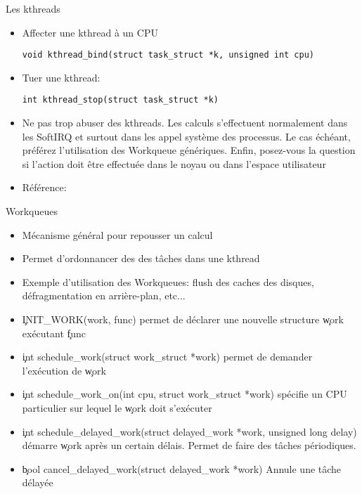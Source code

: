 \begin{frame}[fragile=singleslide]{Les kthreads}
  \begin{itemize}
  \item Affecter une kthread à un CPU
    \begin{lstlisting}
void kthread_bind(struct task_struct *k, unsigned int cpu)
    \end{lstlisting} 
  \item Tuer une kthread:
    \begin{lstlisting} 
int kthread_stop(struct task_struct *k)
    \end{lstlisting} 
  \item  Ne pas  trop abuser  des kthreads.  Les  calculs s'effectuent
    normalement dans les SoftIRQ et surtout dans les appel système des
    processus.  Le cas échéant,  préférez l'utilisation  des Workqueue
    génériques. Enfin,  posez-vous la  question si l'action  doit être
    effectuée dans le noyau ou dans l'espace utilisateur
  \item Référence: 
  \end{itemize} 
\end{frame} 

\begin{frame}[fragile=singleslide]{Workqueues}
  \begin{itemize} 
  \item Mécanisme général pour repousser un calcul
  \item Permet d'ordonnancer des des tâches dans une kthread
  \item  Exemple d'utilisation  des Workqueues:  flush des  caches des
    disques, défragmentation en arrière-plan, etc...
  \item  \c{INIT_WORK(work,  func)} permet  de  déclarer une  nouvelle
    structure \c{work} exécutant \c{func}
  \item \c{int schedule_work(struct work_struct *work)} permet de
    demander l'exécution de \c{work}
  \item  \c{int schedule_work_on(int  cpu, struct  work_struct *work)}
    spécifie un CPU particulier sur lequel le \c{work} doit s'exécuter
  \item
    \c{int schedule_delayed_work(struct delayed_work *work, unsigned long delay)}
    démarre \c{work} après un certain délais. Permet de faire des
    tâches périodiques.
  \item \c{bool cancel_delayed_work(struct delayed_work *work)} Annule
    une tâche délayée
  \end{itemize}
\end{frame}

